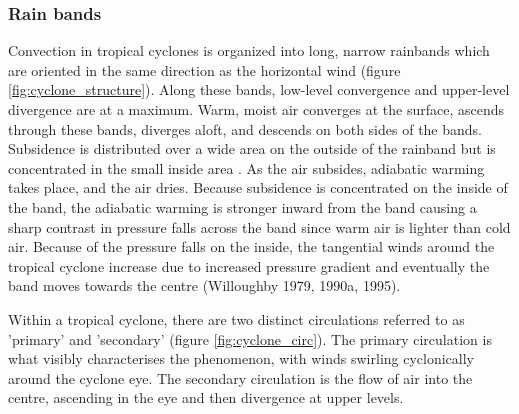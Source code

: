 
\subsubsection{Rain bands}
Convection in tropical cyclones is organized into long, narrow rainbands which are oriented in the same direction as the horizontal wind (figure \ref{fig:cyclone_structure}). Along these bands, low-level convergence and upper-level divergence are at a maximum. Warm, moist air converges at the surface, ascends through these bands, diverges aloft, and descends on both sides of the bands. Subsidence is distributed over a wide area on the outside of the rainband but is concentrated in the small inside area \citep{noaa_a11}. As the air subsides, adiabatic warming takes place, and the air dries. Because subsidence is concentrated on the inside of the band, the adiabatic warming is stronger inward from the band causing a sharp contrast in pressure falls across the band since warm air is lighter than cold air. Because of the pressure falls on the inside, the tangential winds around the tropical cyclone increase due to increased pressure gradient and eventually the band moves towards the centre (Willoughby 1979, 1990a, 1995). 





Within a tropical cyclone, there are two distinct circulations referred to as 'primary' and 'secondary' (figure \ref{fig:cyclone_circ}). The primary circulation is what visibly characterises the phenomenon, with winds swirling cyclonically around the cyclone eye. The secondary circulation is the flow of air into the centre, ascending in the eye and then divergence at upper levels.


